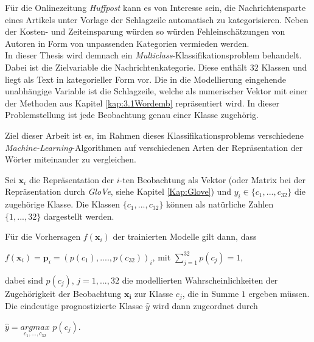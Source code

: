 \documentclass[a4paper,11pt]{article}
\begin{document}
Für die Onlinezeitung \textit{Huffpost} kann es von Interesse sein, die Nachrichtensparte eines Artikels unter Vorlage der Schlagzeile automatisch zu kategorisieren. Neben der Kosten- und Zeiteinsparung würden so würden Fehleinschätzungen von Autoren in Form von unpassenden Kategorien vermieden werden.\\
In dieser Thesis wird demnach ein \textit{Multiclass}-Klassifikations\-problem behandelt. Dabei ist die Zielvariable die Nachrichtenkategorie. Diese enthält $32$ Klassen und liegt als Text in kategorieller Form vor. Die in die Modellierung eingehende unabhängige Variable ist die Schlagzeile, welche als numerischer Vektor mit einer der Methoden aus Kapitel \ref{kap:3.1Wordemb} repräsentiert wird. In dieser Problemstellung ist jede Beobachtung genau einer Klasse zugehörig. 

Ziel dieser Arbeit ist es, im Rahmen dieses Klassifikationsproblems verschiedene \textit{Machine-Learning}-Algorithmen auf verschiedenen Arten der Repräsentation der Wörter miteinander zu vergleichen. 

Sei $\bm{x}_i$ die Repräsentation der $i$-ten Beobachtung als Vektor (oder Matrix bei der Repräsentation durch \textit{GloVe}, siehe Kapitel \ref{Kap:Glove}) und $y_i \in \{c_1, ..., c_{32} \}$ die zugehörige Klasse. Die Klassen $\{c_1, ..., c_{32} \}$ können als natürliche Zahlen $\{1, ..., 32 \}$ dargestellt werden.


Für die Vorhersagen $f(\bm{x}_i)$ der trainierten Modelle gilt dann, dass
\begin{center}
$f(\bm{x}_i) = \bm{p}_i = (p(c_1), ...., p(c_{32}))_i$, \hspace{2cm} mit $\sum\limits_{j = 1}^{32} p(c_j) = 1 $,
\end{center}
dabei sind $p(c_j)$, $j = 1,...,32$ die modellierten Wahrscheinlichkeiten der Zugehörigkeit der Beobachtung $\bm{x_i}$ zur Klasse $c_j$, die in Summe $1$ ergeben müssen. Die eindeutige prognostizierte Klasse $\hat{y}$ wird dann zugeordnet durch 
\begin{center}
    $\hat{y} =  \underset{c_1,...,c_{32}}{argmax}$ $p(c_j)$.
\end{center}
\end{document}
